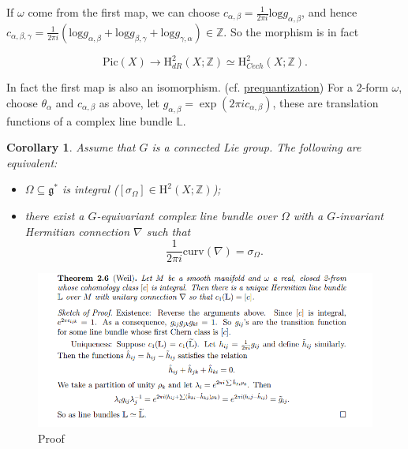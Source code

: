 \documentclass[12pt]{amsart}
\numberwithin{equation}{section}
\newtheorem{cor}[thm]{Corollary}
\newcommand{\BL}{{\mathbb {L}}}
\newcommand{\BZ}{{\mathbb {Z}}}
\newcommand{\fg}{\mathfrak{g}}
\begin{document}
If $\omega$ come from the first map, we can choose $c_{\alpha,\beta} = \frac{1}{2\pi i}\mathrm{log}g_{\alpha,\beta}$, and hence $c_{\alpha,\beta,\gamma} = \frac{1}{2\pi i}(\mathrm{log}g_{\alpha,\beta} +\mathrm{log}g_{\beta,\gamma} +\mathrm{log}g_{\gamma,\alpha} ) \in \BZ$. So the morphism is in fact

\[
    \mathrm{Pic}(X) \longrightarrow  \mathrm{H}^{2}_{dR}(X;\BZ) \simeq  \mathrm{H}^{2}_{Cech}(X;\BZ).
\]

In fact the first map is also an isomorphism. (cf. \href{http://staff.ustc.edu.cn/~wangzuoq/Courses/15S-Symp/SympGeom.html}{prequantization})
For a 2-form $\omega$, choose $\theta_\alpha$ and $c_{\alpha,\beta}$ as above, let $g_{\alpha,\beta} = \exp(2\pi i c_{\alpha,\beta})$, these are translation functions of a complex line bundle $\BL$.

\begin{cor}
  Assume that $G$ is a connected Lie group. The following are equivalent:
  \begin{itemize}
    \item $\Omega \subseteq \fg^*$ is integral ($[\sigma_{\Omega}] \in \mathrm{H}^2(X;\BZ)$);
    \item there exist a $G$-equivariant complex line bundle over $\Omega$ with a $G$-invariant Hermitian connection $\nabla$ such that $$\frac{1}{2\pi i}\mathrm{curv}(\nabla) = \sigma_{\Omega}.$$
  \end{itemize}
\end{cor}

\begin{figure}[H]
  \centering
  \includegraphics[width=1.0\linewidth]{屏幕截图 2024-12-17 180658.png}
  \caption{Proof}
\end{figure}
\end{document}
